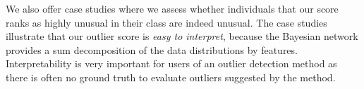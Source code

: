 \documentclass[conference]{IEEEtran}
\begin{document}
We also offer case studies where we assess whether individuals that our score ranks as highly unusual in their class are  indeed unusual. 
The case studies illustrate that our outlier score is {\em easy to interpret}, because the Bayesian network provides a sum decomposition of the data distributions by features. Interpretability is very important for users of an outlier detection method as there is often no ground truth to 
evaluate outliers suggested by the method. %

%
%
\end{document}

